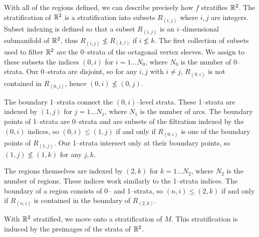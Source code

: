 With all of the regions defined, we can describe precisely how $f$ stratifies $\mathbb{R}^2$.
The stratification of $\mathbb{R}^2$ is a stratification into subsets $R_{(i,j)}$ where $i,j$ are integers.
Subset indexing is defined so that a subset $R_{(i,j)}$ is an $i$--dimensional submanifold of $\mathbb{R}^2$, thus $R_{(i,j)}\nleq R_{(k,l)}$ if $i\nleq k$.
The first collection of subsets used to filter $\mathbb{R}^2$ are the 0--strata of the octagonal vertex sleeves.
We assign to these subsets the indices $(0,i)$ for $i=1\dots N_0$, where $N_0$ is the number of 0--strata.
Our 0--strata are disjoint, so for any $i,j$ with $i\neq j$, $R_{(0,i)}$ is not contained in $R_{(0,j)}$, hence $(0,i)\nleq (0,j)$.

The boundary 1--strata connect the $(0,i)$--level strata.
These 1--strata are indexed by $(1,j)$ for $j=1\dots N_1$, where $N_1$ is the number of arcs.
The boundary points of 1--strata are 0--strata and are subsets of the filtration indexed by the $(0,i)$ indices, so $(0,i)\leq (1,j)$ if and only if $R_{(0,i)}$ is one of the boundary points of $R_{(1,j)}$.
Our 1--strata intersect only at their boundary points, so $(1,j)\nleq(1,k)$ for any $j,k$. 

The regions themselves are indexed by $(2,k)$ for $k=1\dots N_2$, where $N_2$ is the number of regions.
These indices work similarly to the 1--strata indices.
The boundary of a region consists of 0-- and 1--strata, so $(n,i)\leq(2,k)$ if and only if $R_{(n,i)}$ is contained in the boundary of $R_{(2,k)}$.

With $\mathbb{R}^2$ stratified, we move onto a stratification of $M$.
This stratification is induced by the preimages of the strata of $\mathbb{R}^2$.

%
%
%
%

